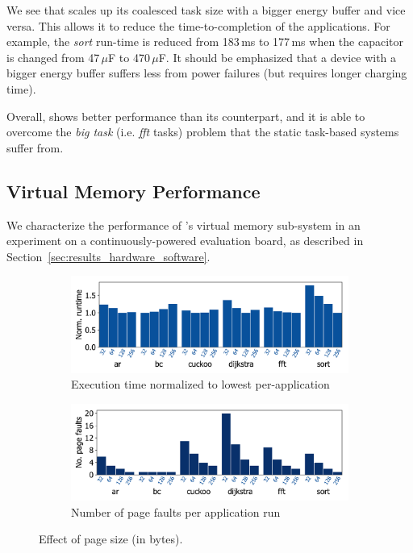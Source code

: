 We see that \sys scales up its coalesced task size with a bigger energy buffer and vice versa. 
This allows it to reduce the time-to-completion of the applications. For example, 
the \textit{sort} run-time is reduced from 183\,ms to 177\,ms when the capacitor is changed from 47\,$\mu$F to 470\,$\mu$F. It should be emphasized that a device with a bigger energy buffer suffers less from power failures (but requires longer charging time). 

 
Overall, \sys shows better performance than its counterpart, and it is able to overcome the \textit{big task} (i.e. \textit{fft} tasks) problem that the static task-based systems suffer from. 

\subsection{Virtual Memory Performance}
\label{sec:results_memory_management}

We characterize the performance of \sys's virtual memory sub-system in an
experiment on a continuously-powered evaluation board, as described in
Section~\ref{sec:results_hardware_software}.

\begin{figure}
	\centering
    \begin{subfigure}{\columnwidth}
			\centering
        \includegraphics[width=.8\columnwidth]{figures/page_exec-time.pdf}
        \caption{Execution time normalized to lowest per-application}
        \label{fig:page-exec-time}
    \end{subfigure}
    \begin{subfigure}{\columnwidth}
			\centering
        \includegraphics[width=.8\columnwidth]{figures/pagePulls.pdf}
        \caption{Number of page faults per application run}
        \label{fig:page-pulls}
    \end{subfigure}
    \caption{Effect of page size (in bytes).}
    \label{fig:war}
\end{figure}

